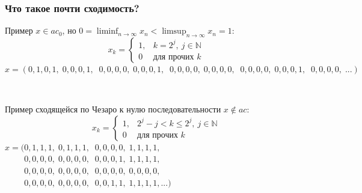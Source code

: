 \documentclass[10pt,pdf,hyperref={unicode},aspectratio=169,color={usenames, dvipsnames}]{beamer}
\theoremstyle{definition}
\begin{document}
\begin{frame}
	\frametitle{Что такое почти сходимость?}
	\begin{varwidth}[t]{\linewidth}
		\hspace{3em}
		Пример $x\in ac_0$, но $\displaystyle0=\liminf_{n\to\infty}x_n < \limsup_{n\to\infty}x_n=1$:~~
		$$\displaystyle
			x_k=\begin{cases}
				1, & k=2^j,~j\in\mathbb N
				\\
				0 & \mbox{для прочих~} k
			\end{cases}
		$$
		$x=(0,1,0,1,\;0,0,0,1,\;\;0,0,0,0,\;0,0,0,1,\;\;0,0,0,0,\;0,0,0,0,\;\;0,0,0,0,\;0,0,0,1,\;\;0,0,0,0,\;...)$
	\end{varwidth}
	\\
	\vspace{2em}
	\begin{varwidth}[t]{\linewidth}
		Пример сходящейся по Чезаро к нулю последовательности $x\notin ac$:~~
		$$\displaystyle
			x_k=\begin{cases}
				1, & 2^j-j < k \leq 2^j,~j\in\mathbb N
				\\
				0 & \mbox{для прочих~} k
			\end{cases}
		$$
		$x=(0,1,1,1,\;0,1,1,1,\;\;0,0,0,0,\;1,1,1,1,$\\
		$\phantom{x=(}0,0,0,0,\;0,0,0,0,\;\;0,0,0,1,\;1,1,1,1,$\\
		$\phantom{x=(}0,0,0,0,\;0,0,0,0,\;\;0,0,0,0,\;0,0,0,0,$\\
		$\phantom{x=(}0,0,0,0,\;0,0,0,0,\;\;0,0,1,1,\;1,1,1,1,...)$
	\end{varwidth}
\end{frame}

\end{document}
